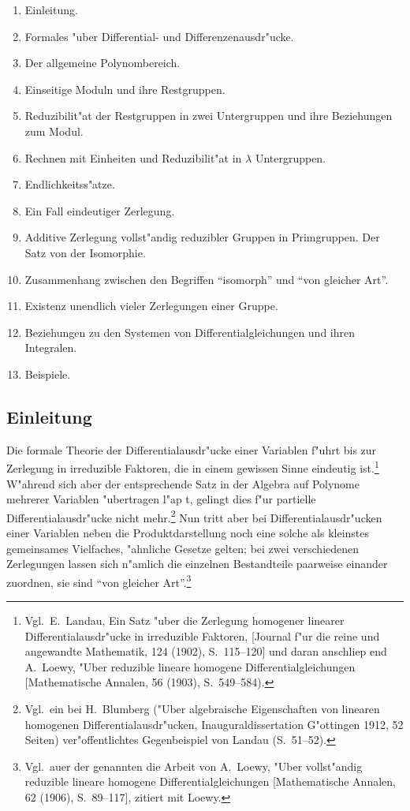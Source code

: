 \documentclass[12pt,a4paper]{article}
\begin{document}
\begin{enumerate}
\item Einleitung.
\item Formales "uber Differential- und Differenzenausdr"ucke.
\item Der allgemeine Polynombereich.
\item Einseitige Moduln und ihre Restgruppen.
\item Reduzibilit"at der Restgruppen in zwei Untergruppen und ihre Beziehungen zum Modul.
\item Rechnen mit Einheiten und Reduzibilit"at in $\lambda$ Untergruppen.
\item Endlichkeitss"atze.
\item Ein Fall eindeutiger Zerlegung.
\item Additive Zerlegung vollst"andig reduzibler Gruppen in Primgruppen. Der Satz von der Isomorphie.
\item Zusammenhang zwischen den Begriffen ``isomorph'' und ``von gleicher Art''.
\item Existenz unendlich vieler Zerlegungen einer Gruppe.
\item Beziehungen zu den Systemen von Differentialgleichungen und ihren Integralen.
\item Beispiele.
\end{enumerate}

\subsection*{Einleitung}

Die formale Theorie der Differentialausdr"ucke einer Variablen f"uhrt bis zur Zerlegung in irreduzible Faktoren, die in einem gewissen Sinne eindeutig ist.\footnote{Vgl.\ E.\ Landau, Ein Satz "uber die Zerlegung homogener linearer Differentialausdr"ucke in irreduzible Faktoren, [Journal f"ur die reine und angewandte Mathematik, 124 (1902), S.~115--120] und daran anschliep end A.\ Loewy, "Uber reduzible lineare homogene Differentialgleichungen [Mathematische Annalen, 56 (1903), S.~549--584).} W"ahrend sich aber der entsprechende Satz in der Algebra auf Polynome mehrerer Variablen "ubertragen l"ap t, gelingt dies f"ur partielle Differentialausdr"ucke nicht mehr.\footnote{Vgl.\ ein bei H.\ Blumberg ("Uber algebraische Eigenschaften von linearen homogenen Differentialausdr"ucken, Inauguraldissertation G"ottingen 1912, 52 Seiten) ver"offentlichtes Gegenbeispiel von Landau (S.~51--52).} Nun tritt aber bei Differentialausdr"ucken einer Variablen neben die Produktdarstellung noch eine solche als kleinstes gemeinsames Vielfaches, "ahnliche Gesetze gelten; bei zwei verschiedenen Zerlegungen lassen sich n"amlich die einzelnen Bestandteile paarweise einander zuordnen, sie sind ``von gleicher Art''.\footnote{Vgl.\ auer der genannten die Arbeit von A.\ Loewy, "Uber vollst"andig reduzible lineare homogene Differentialgleichungen [Mathematische Annalen, 62 (1906), S.~89--117], zitiert mit Loewy.}
\end{document}

